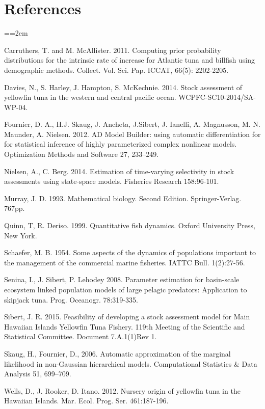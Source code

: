 \documentclass[12pt,letterpaper]{article}
\newcommand\doublespacing{\baselineskip=1.6\normalbaselineskip}
\begin{document}
\section*{References}
{\parindent=0cm \small
\everypar={\hangindent=2em }\par
Carruthers, T. and M. McAllister. 2011.
Computing prior probability distributions for the
intrinsic rate of increase for Atlantic tuna and
billfish using demographic methods.
Collect. Vol. Sci. Pap. ICCAT, 66(5): 2202-2205.

Davies, N., S. Harley, J. Hampton, S. McKechnie. 2014. Stock
assessment of yellowfin tuna in the western and central pacific ocean.
WCPFC-SC10-2014/SA-WP-04.

Fournier, D. A., H.J. Skaug, J. Ancheta, J.Sibert, J. Ianelli, 
A. Magnusson, M. N. Maunder, A. Nielsen. 2012. AD Model Builder:
using automatic differentiation for for statistical inference of highly
parameterized complex nonlinear models. Optimization Methods and
Software 27, 233–249.

Nielsen, A., C. Berg. 2014. Estimation of time-varying selectivity
in stock assessments using state-space models. Fisheries Research
158:96-101.

Murray, J. D. 1993. Mathematical biology. Second Edition.
Springer-Verlag. 767pp.

Quinn, T, R. Deriso. 1999. Quantitative fish dynamics. Oxford
University Press, New York.

Schaefer, M. B. 1954. Some aspects of the dynamics of populations
important to the management of the commercial marine fisheries. IATTC
Bull. 1(2):27-56.

Senina, I., J. Sibert, P. Lehodey  2008. Parameter estimation for
basin-scale ecosystem linked population models of large pelagic
predators: Application to skipjack tuna.  Prog. Oceanogr. 78:319-335.

Sibert, J. R. 2015. Feasibility of developing a stock assessment
model for Main Hawaiian Islands Yellowfin Tuna Fishery.
119th Meeting of the Scientific and Statistical Committee.
Document 7.A.1(1)Rev 1.

Skaug, H., Fournier, D., 2006. Automatic approximation of the marginal
likelihood in non-Gaussian hierarchical models. Computational
Statistics \& Data Analysis 51, 699–709.

Wells, D., J. Rooker, D. Itano. 2012.  Nursery origin of yellowfin
tuna in the Hawaiian Islands. Mar. Ecol. Prog. Ser. 461:187-196. 
\par}


 
\end{document}
